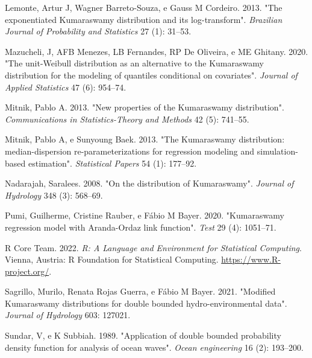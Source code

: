 \documentclass[
]{article}
\newlength{\cslhangindent}
\newlength{\cslentryspacingunit} %
\newenvironment{CSLReferences}[2] %
 {%
  \setlength{\parindent}{0pt}
  \ifodd #1
  \let\oldpar\par
  \def\par{\hangindent=\cslhangindent\oldpar}
  \fi
  \setlength{\parskip}{#2\cslentryspacingunit}
 }%
 {}
\begin{document}
\begin{CSLReferences}{1}{0}
\leavevmode{}%
Lemonte, Artur J, Wagner Barreto-Souza, e Gauss M Cordeiro. 2013. {"The
exponentiated Kumaraswamy distribution and its log-transform"}.
\emph{Brazilian Journal of Probability and Statistics} 27 (1): 31--53.

\leavevmode{}%
Mazucheli, J, AFB Menezes, LB Fernandes, RP De Oliveira, e ME Ghitany.
2020. {"The unit-Weibull distribution as an alternative to the
Kumaraswamy distribution for the modeling of quantiles conditional on
covariates"}. \emph{Journal of Applied Statistics} 47 (6): 954--74.

\leavevmode{}%
Mitnik, Pablo A. 2013. {"New properties of the Kumaraswamy
distribution"}. \emph{Communications in Statistics-Theory and Methods}
42 (5): 741--55.

\leavevmode{}%
Mitnik, Pablo A, e Sunyoung Baek. 2013. {"The Kumaraswamy distribution:
median-dispersion re-parameterizations for regression modeling and
simulation-based estimation"}. \emph{Statistical Papers} 54 (1):
177--92.

\leavevmode{}%
Nadarajah, Saralees. 2008. {"On the distribution of Kumaraswamy"}.
\emph{Journal of Hydrology} 348 (3): 568--69.

\leavevmode{}%
Pumi, Guilherme, Cristine Rauber, e Fábio M Bayer. 2020. {"Kumaraswamy
regression model with Aranda-Ordaz link function"}. \emph{Test} 29 (4):
1051--71.

\leavevmode{}%
R Core Team. 2022. \emph{R: A Language and Environment for Statistical
Computing}. Vienna, Austria: R Foundation for Statistical Computing.
\url{https://www.R-project.org/}.

\leavevmode{}%
Sagrillo, Murilo, Renata Rojas Guerra, e Fábio M Bayer. 2021. {"Modified
Kumaraswamy distributions for double bounded hydro-environmental data"}.
\emph{Journal of Hydrology} 603: 127021.

\leavevmode{}%
Sundar, V, e K Subbiah. 1989. {"Application of double bounded
probability density function for analysis of ocean waves"}. \emph{Ocean
engineering} 16 (2): 193--200.

\end{CSLReferences}
\end{document}
